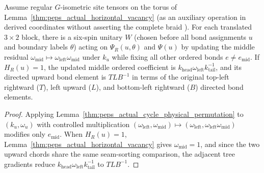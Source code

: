 \begin{lemma}
    \label{thm:peps_actual_horizontal_flux_operation}
    \leanok
    Assume regular $G$-isometric site tensors on the torus of Lemma~\ref{thm:peps_actual_horizontal_vacancy} (as an auxiliary operation in derived coordinates without asserting the complete braid \cite{gap:rmp_peps_quantum_double_g_isometry}).
    For each translated $3\times 2$ block, there is a six-spin unitary $W$ (chosen before all bond assignments $u$ and boundary labels $\theta$) acting on $\Psi_R(u,\theta)$ and $\Psi(u)$ by updating the middle residual $\omega_{\mathrm{mid}}\mapsto \omega_{\mathrm{left}}\omega_{\mathrm{mid}}$ under $k_u$ while fixing all other ordered bonds $e\neq e_{\mathrm{mid}}$.
    If $H_R(u)=1$, the updated middle ordered coefficient is $k_{\mathrm{head}}\omega_{\mathrm{left}}k_{\mathrm{tail}}^{-1}$, and its directed upward bond element is $T L B^{-1}$ in terms of the original top-left rightward ($T$), left upward ($L$), and bottom-left rightward ($B$) directed bond elements.
\end{lemma}
\begin{proof}\leanok
    Applying Lemma~\ref{thm:peps_actual_cycle_physical_permutation} to $(k_u,\omega_u)$ with controlled multiplication $(\omega_{\mathrm{left}},\omega_{\mathrm{mid}})\mapsto(\omega_{\mathrm{left}},\omega_{\mathrm{left}}\omega_{\mathrm{mid}})$ modifies only $e_{\mathrm{mid}}$.
    When $H_R(u)=1$, Lemma~\ref{thm:peps_actual_horizontal_vacancy} gives $\omega_{\mathrm{mid}}=1$, and since the two upward chords share the same seam-sorting comparison, the adjacent tree gradients reduce $k_{\mathrm{head}}\omega_{\mathrm{left}}k_{\mathrm{tail}}^{-1}$ to $T L B^{-1}$.
\end{proof}
